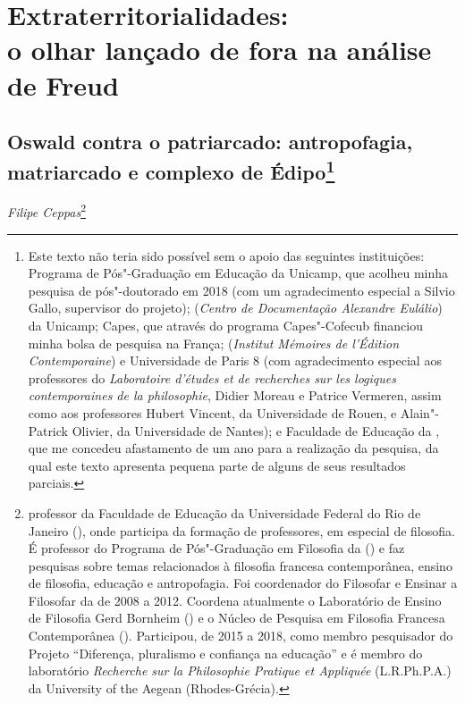 \part{Extraterritorialidades:\\ o olhar lançado de fora na análise de Freud}

\chapter*{Oswald contra o patriarcado: antropofagia, matriarcado e
complexo de Édipo\footnote{Este texto não teria sido possível sem o
  apoio das seguintes instituições: Programa de Pós"-Graduação em
  Educação da Unicamp, que acolheu minha pesquisa de pós"-doutorado em
  2018 (com um agradecimento especial a Silvio Gallo, supervisor do
  projeto);  (\emph{Centro de Documentação Alexandre Eulálio}) da
  Unicamp; Capes, que através do programa Capes"-Cofecub financiou minha
  bolsa de pesquisa na França;  (\emph{Institut Mémoires de
  l'Édition Contemporaine}) e Universidade de Paris 8 (com agradecimento
  especial aos professores do \emph{Laboratoire d'études et de
  recherches sur les logiques contemporaines de la philosophie}, Didier
  Moreau e Patrice Vermeren, assim como aos professores Hubert Vincent,
  da Universidade de Rouen, e Alain"-Patrick Olivier, da Universidade de
  Nantes); e Faculdade de Educação da , que me concedeu afastamento
  de um ano para a realização da pesquisa, da qual este texto apresenta
  pequena parte de alguns de seus resultados parciais.}}

\begin{flushright}
\emph{Filipe Ceppas}\footnote{professor da Faculdade de Educação da Universidade Federal do
Rio de Janeiro (), onde participa da formação de professores, em especial
de filosofia. É professor do Programa de Pós"-Graduação em Filosofia da 
() e faz pesquisas sobre temas relacionados à filosofia francesa
contemporânea, ensino de filosofia, educação e antropofagia. Foi coordenador
do  Filosofar e Ensinar a Filosofar da  de 2008 a 2012. Coordena
atualmente o Laboratório de Ensino de Filosofia Gerd Bornheim () e o Núcleo de Pesquisa em Filosofia Francesa Contemporânea (). Participou, de 2015 a 2018, como membro pesquisador do Projeto  ``Diferença, pluralismo e confiança na educação'' e é membro do laboratório \emph{Recherche sur la Philosophie Pratique et Appliquée} (L.R.Ph.P.A.) da University of the Aegean (Rhodes-Grécia).}
\end{flushright}

